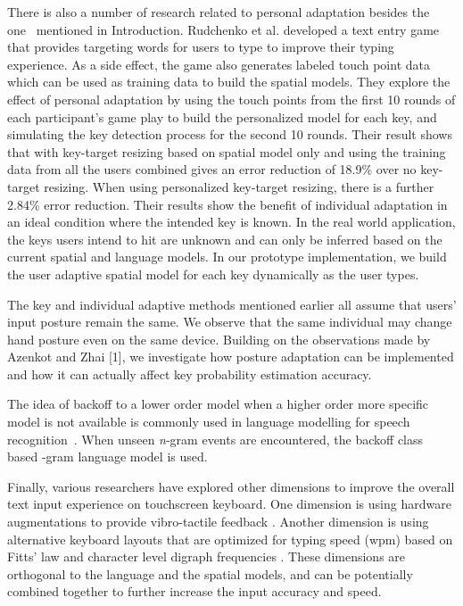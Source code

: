 \documentclass{sigchi}
\begin{document}
There is also a number of research related to personal adaptation besides the one~\cite{Findlater:2012} mentioned in Introduction. 
Rudchenko et al. \cite{Rudchenko:2011}
developed a text entry game that provides 
targeting words for users to type to improve their typing experience. As a side effect,
the game also generates labeled touch point data which can be used as
training data to build the spatial models. They explore the effect of personal adaptation
by using the touch points from the first 10 rounds of each 
participant's game play to build the personalized model for each key, and simulating the key detection
process for the second 10 rounds. Their result shows that with key-target resizing based on
spatial model only and using the training data from all the users combined
gives an error reduction of 18.9\% over no key-target resizing. When using personalized
key-target resizing, there is a further 2.84\% error reduction.
Their results show the benefit of individual adaptation in an ideal condition where the 
intended key is known. In the real world application, the keys users intend to hit are unknown and can only be inferred based on the current spatial and language models. In our prototype implementation, we build the user adaptive spatial model for each key dynamically as the user types. 

The key and individual adaptive methods mentioned earlier all assume that users' input posture
remain the same. We observe that the same individual may change hand posture even on the same device. Building on the observations made by Azenkot and Zhai [1], we investigate how posture adaptation can be implemented and how it can actually affect key probability estimation accuracy.

The idea of backoff to a lower order model when a higher order more specific model is not available is commonly used in language modelling for speech recognition~\cite{Zitouni:2007}. When unseen \textit{n}-gram events are encountered, the backoff class based -gram language model is used.

Finally, various researchers have explored other dimensions to improve the overall
text input experience on touchscreen keyboard. One dimension is using hardware
augmentations to provide vibro-tactile feedback \cite{Brewster:2007, Hoggan:2008}. 
Another dimension is using alternative keyboard layouts that are optimized for typing speed (wpm)
based on Fitts' law and character level digraph frequencies \cite{Zhai:2000, MacKenzie:1999}.
These dimensions are orthogonal to the language and the spatial models, and can be potentially 
combined together to further increase the input accuracy and speed.
\end{document}
